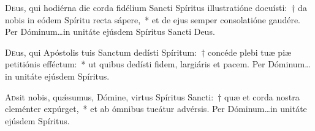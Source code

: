 \documentclass[vesperale_romanum.tex]{subfiles}
\begin{document}







\oratio \label{or_dom_pent}

\lettrine{D}{e}us, qui hodiérna die corda fidélium Sancti Spíritus illustratióne docuísti:~† da nobis in eódem Spíritu recta sápere,~* et de ejus semper consolatióne gaudére.
Per Dóminum…in unitáte ejúsdem Spíritus Sancti Deus.





\oratio

\lettrine{D}{e}us, qui Apóstolis tuis Sanctum dedísti Spíritum:~† concéde plebi tuæ piæ petitiónis effé\-ctum:~* ut quibus dedísti fidem, largiáris et pacem.
Per Dóminum…in unitáte ejúsdem Spíritus.



\oratio

\lettrine{A}{d}sit nobis, quǽsumus, Dómine, virtus Spíritus Sancti:~† quæ et corda nostra cleménter expúrget,~* et ab ómnibus tueátur advérsis. Per Dóminum…in unitáte ejúsdem Spíritus.


\end{document}
